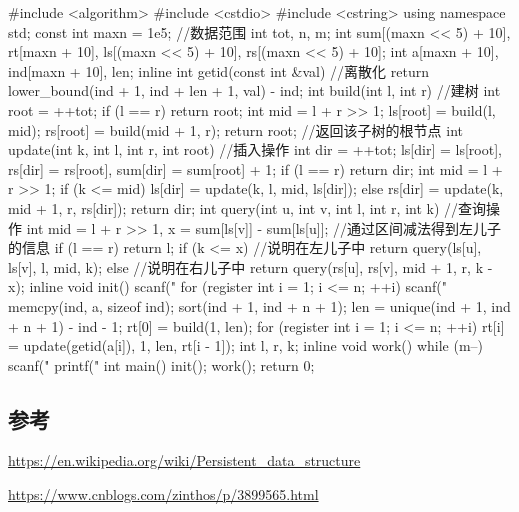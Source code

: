 \begin{cppcode}
#include <algorithm>
#include <cstdio>
#include <cstring>
using namespace std;
const int maxn = 1e5;  //数据范围
int tot, n, m;
int sum[(maxn << 5) + 10], rt[maxn + 10], ls[(maxn << 5) + 10],
    rs[(maxn << 5) + 10];
int a[maxn + 10], ind[maxn + 10], len;
inline int getid(const int &val)  //离散化
{
  return lower_bound(ind + 1, ind + len + 1, val) - ind;
}
int build(int l, int r)  //建树
{
  int root = ++tot;
  if (l == r) return root;
  int mid = l + r >> 1;
  ls[root] = build(l, mid);
  rs[root] = build(mid + 1, r);
  return root;  //返回该子树的根节点
}
int update(int k, int l, int r, int root)  //插入操作
{
  int dir = ++tot;
  ls[dir] = ls[root], rs[dir] = rs[root], sum[dir] = sum[root] + 1;
  if (l == r) return dir;
  int mid = l + r >> 1;
  if (k <= mid)
    ls[dir] = update(k, l, mid, ls[dir]);
  else
    rs[dir] = update(k, mid + 1, r, rs[dir]);
  return dir;
}
int query(int u, int v, int l, int r, int k)  //查询操作
{
  int mid = l + r >> 1,
      x = sum[ls[v]] - sum[ls[u]];  //通过区间减法得到左儿子的信息
  if (l == r) return l;
  if (k <= x)  //说明在左儿子中
    return query(ls[u], ls[v], l, mid, k);
  else  //说明在右儿子中
    return query(rs[u], rs[v], mid + 1, r, k - x);
}
inline void init() {
  scanf("%
  for (register int i = 1; i <= n; ++i) scanf("%
  memcpy(ind, a, sizeof ind);
  sort(ind + 1, ind + n + 1);
  len = unique(ind + 1, ind + n + 1) - ind - 1;
  rt[0] = build(1, len);
  for (register int i = 1; i <= n; ++i)
    rt[i] = update(getid(a[i]), 1, len, rt[i - 1]);
}
int l, r, k;
inline void work() {
  while (m--) {
    scanf("%
    printf("%
  }
}
int main() {
  init();
  work();
  return 0;
}
\end{cppcode}

\subsection{参考}

\url{https://en.wikipedia.org/wiki/Persistent_data_structure}

\url{https://www.cnblogs.com/zinthos/p/3899565.html}
